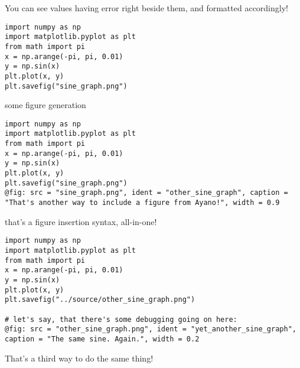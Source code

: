 \documentclass[a4paper]{article}
\begin{document}
You can see values having error right beside them, and formatted accordingly! \\

\begin{verbatim}
import numpy as np
import matplotlib.pyplot as plt
from math import pi
x = np.arange(-pi, pi, 0.01)
y = np.sin(x)
plt.plot(x, y)
plt.savefig("sine_graph.png")
\end{verbatim}

some figure generation \\

\begin{verbatim}
import numpy as np
import matplotlib.pyplot as plt
from math import pi
x = np.arange(-pi, pi, 0.01)
y = np.sin(x)
plt.plot(x, y)
plt.savefig("sine_graph.png")
@fig: src = "sine_graph.png", ident = "other_sine_graph", caption = "That's another way to include a figure from Ayano!", width = 0.9
\end{verbatim}

that's a figure insertion syntax, all-in-one! \\

\begin{verbatim}
import numpy as np
import matplotlib.pyplot as plt
from math import pi
x = np.arange(-pi, pi, 0.01)
y = np.sin(x)
plt.plot(x, y)
plt.savefig("../source/other_sine_graph.png")

# let's say, that there's some debugging going on here:
@fig: src = "other_sine_graph.png", ident = "yet_another_sine_graph", caption = "The same sine. Again.", width = 0.2
\end{verbatim}

That's a third way to do the same thing! \\
\end{document}
